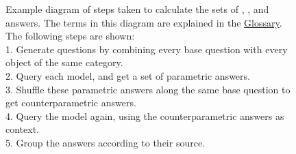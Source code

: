 \begin{figure}[tb]
	\centering
	\caption{Example diagram of steps taken to calculate the sets of \Parametric{}, \Contextual{}, and \Other{} answers. The terms in this diagram are explained in the \protect\hyperref[glossary]{Glossary}.
	The following steps are shown: \\
		\phantom{.}\hspace{5pt} 1. Generate questions by combining every base question with every object of the same category. \\
		\phantom{.}\hspace{5pt} 2. Query each model, and get a set of parametric answers. \\
		\phantom{.}\hspace{5pt} 3. Shuffle these parametric answers along the same base question to get counterparametric answers. \\
		\phantom{.}\hspace{5pt} 4. Query the model again, using the counterparametric answers as context. \\
		\phantom{.}\hspace{5pt} 5. Group the answers according to their source.
	}
	\label{action_diagram}
\end{figure}

